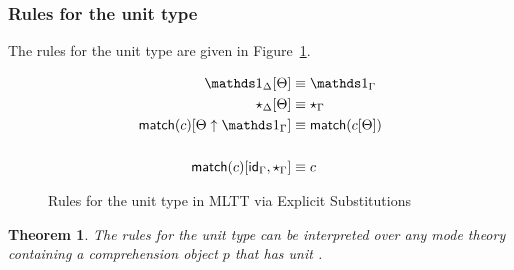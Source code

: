 \documentclass[10pt]{article}
\newtheorem{theorem}{Theorem}
\theoremstyle{definition}
\newcommand{\TYPE}{\,\,\mathsf{Type}}
\newcommand{\id}{\mathsf{id}}
\begin{document}
\subsubsection{Rules for the unit type}
\newcommand\qunitmatch[1]{\ensuremath{\mathsf{match}(#1)}}

The rules for the unit type are given in Figure~\ref{fig:qit-unit-rules}.

\begin{figure}
\begin{align}
\One_\Delta[\Theta] &\equiv \One_\Gamma \\
\star_\Delta[\Theta] &\equiv \star_\Gamma \\ 
\qunitmatch{c}[\Theta \uparrow \One_\Gamma] &\equiv \qunitmatch{c[\Theta]} \\
\nonumber \\
\qunitmatch{c}[\id_\Gamma, \star_\Gamma] &\equiv c
\end{align}
\caption{Rules for the unit type in MLTT via Explicit Substitutions}\label{fig:qit-unit-rules}
\end{figure}

\begin{theorem}
The rules for the unit type can be interpreted over any mode theory containing a comprehension object $p$ that has unit .
\end{theorem}
\end{document}
